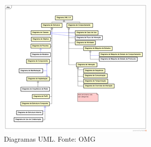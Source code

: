 \begin{figure}[hbt]
    \centering
    \includegraphics[width=0.7\linewidth]{Images/diagramasuml}
    \caption{Diagramas UML. Fonte: OMG}
    \label{fig:diagramasuml}
\end{figure}





